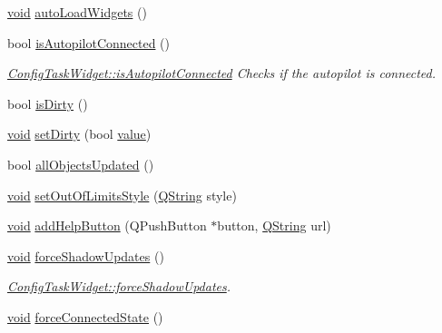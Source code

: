 \begin{DoxyCompactItemize}
\item 
\hyperlink{group___u_a_v_objects_plugin_ga444cf2ff3f0ecbe028adce838d373f5c}{void} \hyperlink{group___u_a_v_object_widget_utils_ga945551d9d4d280fe2cd14bc2646d8fbf}{auto\-Load\-Widgets} ()
\item 
bool \hyperlink{group___u_a_v_object_widget_utils_gad61b70a01e85822c5838c2c5833c22fd}{is\-Autopilot\-Connected} ()
\begin{DoxyCompactList}\small\item\em \hyperlink{group___u_a_v_object_widget_utils_gad61b70a01e85822c5838c2c5833c22fd}{Config\-Task\-Widget\-::is\-Autopilot\-Connected} Checks if the autopilot is connected. \end{DoxyCompactList}\item 
bool \hyperlink{group___u_a_v_object_widget_utils_ga2d7e19cef57df7b30741b4901b5a190f}{is\-Dirty} ()
\item 
\hyperlink{group___u_a_v_objects_plugin_ga444cf2ff3f0ecbe028adce838d373f5c}{void} \hyperlink{group___u_a_v_object_widget_utils_gae75127fbfffe10458defc31a6a18c0f8}{set\-Dirty} (bool \hyperlink{glext_8h_aa0e2e9cea7f208d28acda0480144beb0}{value})
\item 
bool \hyperlink{group___u_a_v_object_widget_utils_ga62e7277f3b8228d44da13a2355b96e9a}{all\-Objects\-Updated} ()
\item 
\hyperlink{group___u_a_v_objects_plugin_ga444cf2ff3f0ecbe028adce838d373f5c}{void} \hyperlink{group___u_a_v_object_widget_utils_gaefefd74c41c3c7655ae047ae80d6dba8}{set\-Out\-Of\-Limits\-Style} (\hyperlink{group___u_a_v_objects_plugin_gab9d252f49c333c94a72f97ce3105a32d}{Q\-String} style)
\item 
\hyperlink{group___u_a_v_objects_plugin_ga444cf2ff3f0ecbe028adce838d373f5c}{void} \hyperlink{group___u_a_v_object_widget_utils_ga369a4d9a6a1eba7ba8e61e64f1d89b80}{add\-Help\-Button} (Q\-Push\-Button $\ast$button, \hyperlink{group___u_a_v_objects_plugin_gab9d252f49c333c94a72f97ce3105a32d}{Q\-String} url)
\item 
\hyperlink{group___u_a_v_objects_plugin_ga444cf2ff3f0ecbe028adce838d373f5c}{void} \hyperlink{group___u_a_v_object_widget_utils_gaae2888fd71dce34ad0c33aed78952e23}{force\-Shadow\-Updates} ()
\begin{DoxyCompactList}\small\item\em \hyperlink{group___u_a_v_object_widget_utils_gaae2888fd71dce34ad0c33aed78952e23}{Config\-Task\-Widget\-::force\-Shadow\-Updates}. \end{DoxyCompactList}\item 
\hyperlink{group___u_a_v_objects_plugin_ga444cf2ff3f0ecbe028adce838d373f5c}{void} \hyperlink{group___u_a_v_object_widget_utils_gaef1ebd891852a741315a8b69975876e6}{force\-Connected\-State} ()
\end{DoxyCompactItemize}
